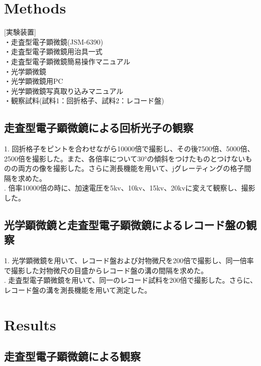\documentclass[a4paper,11pt]{jsarticle}
\begin{document}
\section{Methods}
 [実験装置]\\
・走査型電子顕微鏡(JSM-6390)\\
・走査型電子顕微鏡用治具一式\\
・走査型電子顕微鏡簡易操作マニュアル\\
・光学顕微鏡\\
・光学顕微鏡用PC\\
・光学顕微鏡写真取り込みマニュアル\\
・観察試料(試料1：回折格子、試料2：レコード盤)
\\

\subsection{走査型電子顕微鏡による回析光子の観察}
1. 回折格子をピントを合わせながら10000倍で撮影し、その後7500倍、5000倍、2500倍を撮影した。また、各倍率について30°の傾斜をつけたものとつけないものの両方の像を撮影した。さらに測長機能を用いて、jグレーティングの格子間隔を求めた。\\
. 倍率10000倍の時に、加速電圧を5kv、10kv、15kv、20kvに変えて観察し、撮影した。
\subsection{光学顕微鏡と走査型電子顕微鏡によるレコード盤の観察}
1. 光学顕微鏡を用いて、レコード盤および対物微尺を200倍で撮影し、同一倍率で撮影した対物微尺の目盛からレコード盤の溝の間隔を求めた。\\
. 走査型電子顕微鏡を用いて、同一のレコード試料を200倍で撮影した。さらに、レコード盤の溝を測長機能を用いて測定した。

\section{Results}
\subsection{走査型電子顕微鏡による観察}
\end{document}
